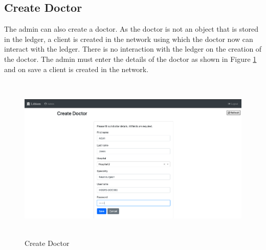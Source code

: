 \subsection{Create Doctor}
The admin can also create a doctor. As the doctor is not an object that is stored in the ledger, a client is created in the network using which the doctor now can interact with the ledger. There is no interaction with the ledger on the creation of the doctor. The admin must enter the details of the doctor as shown in Figure \ref{fig:chapter03:admin6} and on save a client is created in the network.
\begin{figure}[htbp]
 \centering
 \includegraphics[height=8cm]{gfx/figures/admin6.png}
 \caption{Create Doctor}
 \label{fig:chapter03:admin6}
\end{figure}

